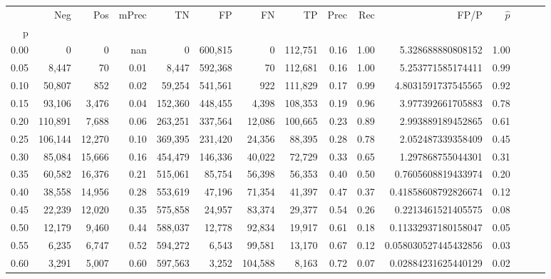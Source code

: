 \begin{tabular}{rrrrrrrrrrrrrrr}
\toprule
{} &      Neg &     Pos & mPrec &       TN &       FP &       FN &       TP &  Prec &   Rec &                    FP/P & $\hat{p}$ \\
p    &          &         &       &          &          &          &          &       &       &                         &           \\
\midrule
0.00 &        0 &       0 &   nan &        0 &  600,815 &        0 &  112,751 &  0.16 &  1.00 &       5.328688880808152 &      1.00 \\
0.05 &    8,447 &      70 &  0.01 &    8,447 &  592,368 &       70 &  112,681 &  0.16 &  1.00 &       5.253771585174411 &      0.99 \\
0.10 &   50,807 &     852 &  0.02 &   59,254 &  541,561 &      922 &  111,829 &  0.17 &  0.99 &      4.8031591737545565 &      0.92 \\
0.15 &   93,106 &   3,476 &  0.04 &  152,360 &  448,455 &    4,398 &  108,353 &  0.19 &  0.96 &       3.977392661705883 &      0.78 \\
0.20 &  110,891 &   7,688 &  0.06 &  263,251 &  337,564 &   12,086 &  100,665 &  0.23 &  0.89 &       2.993889189452865 &      0.61 \\
0.25 &  106,144 &  12,270 &  0.10 &  369,395 &  231,420 &   24,356 &   88,395 &  0.28 &  0.78 &       2.052487339358409 &      0.45 \\
0.30 &   85,084 &  15,666 &  0.16 &  454,479 &  146,336 &   40,022 &   72,729 &  0.33 &  0.65 &       1.297868755044301 &      0.31 \\
0.35 &   60,582 &  16,376 &  0.21 &  515,061 &   85,754 &   56,398 &   56,353 &  0.40 &  0.50 &      0.7605608819433974 &      0.20 \\
0.40 &   38,558 &  14,956 &  0.28 &  553,619 &   47,196 &   71,354 &   41,397 &  0.47 &  0.37 &     0.41858608792826674 &      0.12 \\
0.45 &   22,239 &  12,020 &  0.35 &  575,858 &   24,957 &   83,374 &   29,377 &  0.54 &  0.26 &      0.2213461521405575 &      0.08 \\
0.50 &   12,179 &   9,460 &  0.44 &  588,037 &   12,778 &   92,834 &   19,917 &  0.61 &  0.18 &     0.11332937180158047 &      0.05 \\
0.55 &    6,235 &   6,747 &  0.52 &  594,272 &    6,543 &   99,581 &   13,170 &  0.67 &  0.12 &    0.058030527445432856 &      0.03 \\
0.60 &    3,291 &   5,007 &  0.60 &  597,563 &    3,252 &  104,588 &    8,163 &  0.72 &  0.07 &     0.02884231625440129 &      0.02 \\

\end{tabular}
